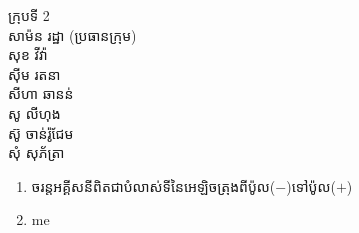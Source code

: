 \documentclass[15pt,a4paper]{article}
\author{james1}
\date{\today}
\newenvironment{kfont}{\khfont}{}
\begin{document}
\hfill\begin{minipage}{.5\linewidth}
\begin{kfont}ក្រុបទី\end{kfont} 2\\
\begin{kfont}សាម៉ន រដ្ឋា (ប្រធានក្រុម)\end{kfont}\\
\begin{kfont}សុខ វីវ៉ា\end{kfont}\\
\begin{kfont}សុីម រតនា\end{kfont}\\
\begin{kfont}សីហា ឆានន់\end{kfont}\\
\begin{kfont}សូ លីហុង\end{kfont}\\
\begin{kfont}ស៊ូ ចាន់រ៉ូជែម\end{kfont}\\
\begin{kfont}សុំ សុភ័ត្រា\end{kfont}
\end{minipage}
\begin{enumerate}
\item 
\begin{kfont}
ចរន្តអគ្គីសនីពិតជាបំលាស់ទីនៃអេឡិចត្រុងពីប៉ូល(\(-\))ទៅប៉ូល(\(+\))
\end{kfont}
\item 
me
\end{enumerate}
\end{document}
